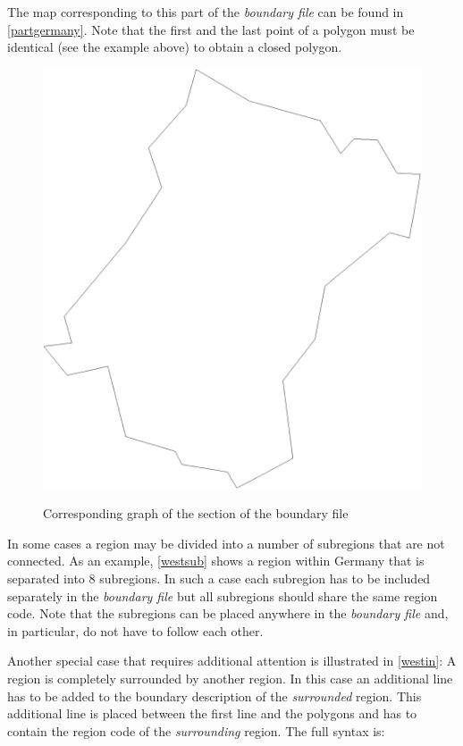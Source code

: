 \vspace{0.3cm}

The  map corresponding to this part of the {\em boundary file} can
be found in \autoref{partgermany}. Note that the first and the
last point of a polygon must be identical (see the example above)
to obtain a closed polygon.


\begin{figure}[ht]
\centering
\includegraphics [scale=0.3]{grafiken/westpart.eps}
{\em\caption{\label{partgermany} Corresponding graph of the
section of the boundary file}}
\end{figure}

In some cases a region may be divided into a number of subregions
that are not connected. As an example, \autoref{westsub} shows a
region within Germany that is separated into 8 subregions. In such
a case each subregion has to be included separately in the {\em
boundary file} but all subregions should share the same region
code. Note that the subregions can be placed anywhere in the {\em
boundary file} and, in particular, do not have to follow each
other.

Another special case that requires additional attention is
illustrated in \autoref{westin}: A region is completely surrounded
by another region. In this case an additional line has to be added
to the boundary description of the {\em surrounded} region. This
additional line is placed between the first line and the polygons
and has to contain the region code of the {\em surrounding}
region. The full syntax is:

